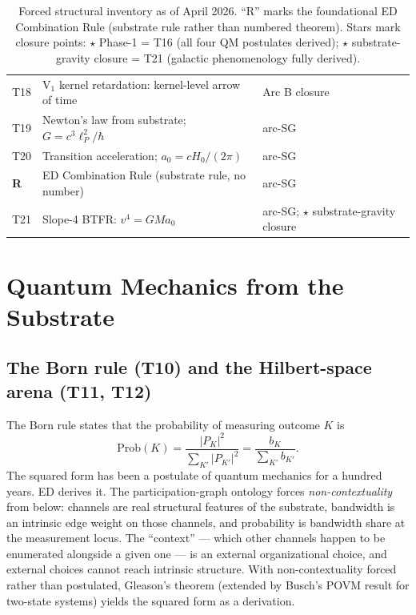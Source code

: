 \documentclass[11pt,a4paper]{article}
\begin{document}
\begin{table}[h]
\begin{tabular}{@{}p{0.8cm}p{6.0cm}p{6.0cm}@{}}
T18 & V$_1$ kernel retardation: kernel-level arrow of time & Arc B closure \\
T19 & Newton's law from substrate; $G = c^3 \ell_P^2 / \hbar$ & arc-SG \\
T20 & Transition acceleration; $a_0 = c H_0/(2\pi)$ & arc-SG \\
\textbf{R} & ED Combination Rule (substrate rule, no number) & arc-SG \\
T21 & Slope-4 BTFR: $v^4 = G M a_0$ & arc-SG; $\star$ substrate-gravity closure \\
\bottomrule
\end{tabular}
\caption{Forced structural inventory as of April 2026. ``R'' marks the foundational ED Combination Rule (substrate rule rather than numbered theorem). Stars mark closure points: $\star$ Phase-1 = T16 (all four QM postulates derived); $\star$ substrate-gravity closure = T21 (galactic phenomenology fully derived).}
\label{tab:theorems}
\end{table}

\section{Quantum Mechanics from the Substrate}\label{sec:qm}

\subsection{The Born rule (T10) and the Hilbert-space arena (T11, T12)}

The Born rule states that the probability of measuring outcome $K$ is
\begin{equation}
\mathrm{Prob}(K) = \frac{|P_K|^2}{\sum_{K'} |P_{K'}|^2} = \frac{b_K}{\sum_{K'} b_{K'}}.
\end{equation}
The squared form has been a postulate of quantum mechanics for a hundred years. ED derives it. The participation-graph ontology forces \emph{non-contextuality} from below: channels are real structural features of the substrate, bandwidth is an intrinsic edge weight on those channels, and probability is bandwidth share at the measurement locus. The ``context'' --- which other channels happen to be enumerated alongside a given one --- is an external organizational choice, and external choices cannot reach intrinsic structure. With non-contextuality forced rather than postulated, Gleason's theorem (extended by Busch's POVM result for two-state systems) yields the squared form as a derivation.
\end{document}
